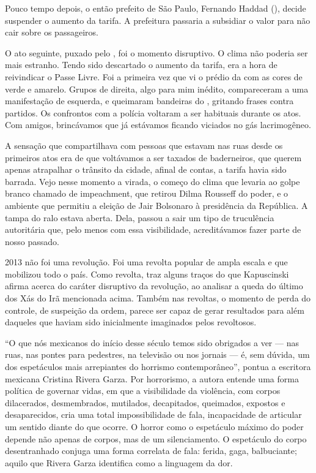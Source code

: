 Pouco tempo depois, o então prefeito de São Paulo, Fernando Haddad (),
decide suspender o aumento da tarifa. A prefeitura passaria a subsidiar
o valor para não cair sobre os passageiros.

O ato seguinte, puxado pelo , foi o momento disruptivo. O clima não
poderia ser mais estranho. Tendo sido descartado o aumento da tarifa,
era a hora de reivindicar o Passe Livre. Foi a primeira vez que vi o
prédio da  com as cores de verde e amarelo. Grupos de direita, algo
para mim inédito, compareceram a uma manifestação de esquerda, e
queimaram bandeiras do , gritando frases contra partidos. Os
confrontos com a polícia voltaram a ser habituais durante os atos. Com
amigos, brincávamos que já estávamos ficando viciados no gás
lacrimogêneo.

A sensação que compartilhava com pessoas que estavam nas ruas desde os
primeiros atos era de que voltávamos a ser taxados de baderneiros, que
querem apenas atrapalhar o trânsito da cidade, afinal de contas, a
tarifa havia sido barrada. Vejo nesse momento a virada, o começo do
clima que levaria ao golpe branco chamado de impeachment, que retirou
Dilma Rousseff do poder, e o ambiente que permitiu a eleição de Jair Bolsonaro à
presidência da República. A tampa do ralo estava aberta. Dela, passou a
sair um tipo de truculência autoritária que, pelo menos com essa
visibilidade, acreditávamos fazer parte de nosso passado.

2013 não foi uma revolução. Foi uma revolta popular de ampla escala e
que mobilizou todo o país. Como revolta, traz alguns traços do que
Kapuscinski afirma acerca do caráter disruptivo da revolução, ao
analisar a queda do último dos Xás do Irã mencionada acima. Também nas
revoltas, o momento de perda do controle, de suspeição da ordem, parece
ser capaz de gerar resultados para além daqueles que haviam sido
inicialmente imaginados pelos revoltosos.

\asterisc

``O que nós mexicanos do início desse século temos sido obrigados a ver
--- nas ruas, nas pontes para pedestres, na televisão ou nos jornais ---
é, sem dúvida, um dos espetáculos mais arrepiantes do horrismo
contemporâneo'', pontua a escritora mexicana Cristina Rivera Garza. Por
horrorismo, a autora entende uma forma política de governar vidas, em
que a visibilidade da violência, com corpos dilacerados, desmembrados,
mutilados, decapitados, queimados, expostos e desaparecidos, cria uma
total impossibilidade de fala, incapacidade de articular um sentido
diante do que ocorre. O horror como o espetáculo máximo do poder depende
não apenas de corpos, mas de um silenciamento. O espetáculo do corpo
desentranhado conjuga uma forma correlata de fala: ferida, gaga,
balbuciante; aquilo que Rivera Garza identifica como a linguagem da dor.

